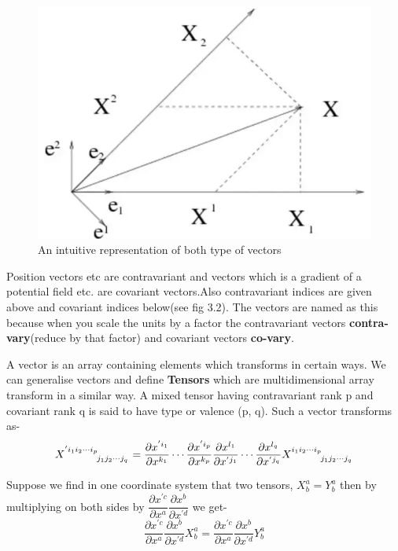 \documentclass[12pt,a4paper]{article}
\numberwithin{table}{section}
\numberwithin{figure}{section}
\numberwithin{equation}{section}
\theoremstyle{remark}
\theoremstyle{definition}
\begin{document}
\begin{figure}[h]
    \centering
  \includegraphics[scale=0.6]{vectors}
  \caption{An intuitive representation of both type of vectors}
  \label{fig:vectors}
\end{figure}

Position vectors etc are contravariant and vectors which is a gradient of a potential field etc. are covariant vectors.Also contravariant indices are given above and covariant indices below(see fig 3.2). The vectors are named as this because when you scale the units by a factor the contravariant vectors \textbf{contra-vary}(reduce by that factor) and covariant vectors \textbf{co-vary}.

A vector is an array containing elements which transforms in certain ways. We can generalise vectors and define \textbf{Tensors} which are multidimensional array transform in a similar way. A mixed tensor having contravariant rank p and covariant rank q is said to have type or valence (p, q). Such a vector transforms as-$$\tensor{X}{^{'i_1i_2\cdots i_p}_{j_1j_2\cdots j_q }}=\dfrac{\partial x^{'i_1}}{\partial x^{k_1}}\cdots \dfrac{\partial x^{'i_p}}{\partial x^{k_p}} \dfrac{\partial x^{l_1}}{\partial x^{'j_1}}\cdots \dfrac{\partial x^{l_q}}{\partial x^{'j_q}}  \tensor{X}{^{i_1i_2\cdots i_p}_{j_1j_2\cdots j_q }} $$

Suppose we find in one coordinate system that two tensors, $X^a_b=Y^a_b$ then by multiplying on both sides by $\dfrac{\partial x^{'c}}{\partial x^a}\dfrac{\partial x^b}{\partial x^{'d}} $ we get-
$$\dfrac{\partial x^{'c}}{\partial x^a}\dfrac{\partial x^b}{\partial x^{'d}} X^a_b =\dfrac{\partial x^{'c}}{\partial x^a}\dfrac{\partial x^b}{\partial x^{'d}}Y^a_b $$
\end{document}
